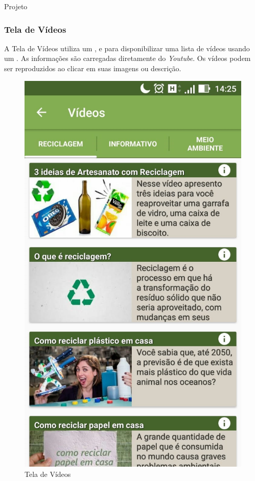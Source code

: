 \documentclass[
	12pt,				%
	openany,			%
	twoside,			%
	a4paper,			%
	english,			%
	french,				%
	spanish,			%
	brazil				%
	]{abntex2}
\begin{document}
\begin{chapter}{Projeto}
\newpage
\subsubsection{Tela de Vídeos}
A Tela de Vídeos utiliza um ,  e  para disponibilizar uma lista de vídeos usando um . As informações são carregadas diretamente do \textit{Youtube}. Os vídeos podem ser reproduzidos ao clicar em suas imagens ou descrição.

    \begin{figure}[htb]    
 \centering
  \begin{minipage}{0.45\textwidth}
    \centering
    \caption{Tela de Vídeos}
    \includegraphics[scale=0.35]{media/tela_videos_1.jpg}

\end{minipage}
\end{figure}
\end{chapter}
\end{document}
